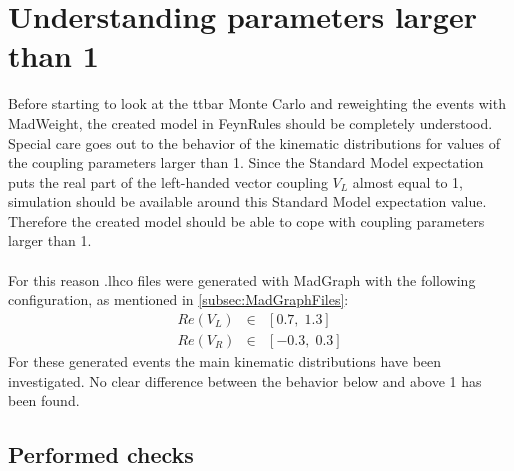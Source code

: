 \documentclass[a4paper,12pt]{report}
\begin{document}
\section{Understanding parameters larger than 1}
Before starting to look at the ttbar Monte Carlo and reweighting the events with MadWeight, the created model in FeynRules should be completely understood.
Special care goes out to the behavior of the kinematic distributions for values of the coupling parameters larger than 1. Since the Standard Model expectation puts the real part of the left-handed vector coupling $V_L$ almost equal to 1, simulation should be available around this Standard Model expectation value.
Therefore the created model should be able to cope with coupling parameters larger than 1. \\
\\
For this reason .lhco files were generated with MadGraph with the following configuration, as mentioned in \ref{subsec:MadGraphFiles}:
\begin{eqnarray*}
  Re(V_L) & \in & \left[  0.7, \; 1.3\right] \\
  Re(V_R) & \in & \left[ -0.3, \; 0.3\right]
\end{eqnarray*}
For these generated events the main kinematic distributions have been investigated.
No clear difference between the behavior below and above 1 has been found.

\newpage
\subsection{Performed checks}
\end{document}
